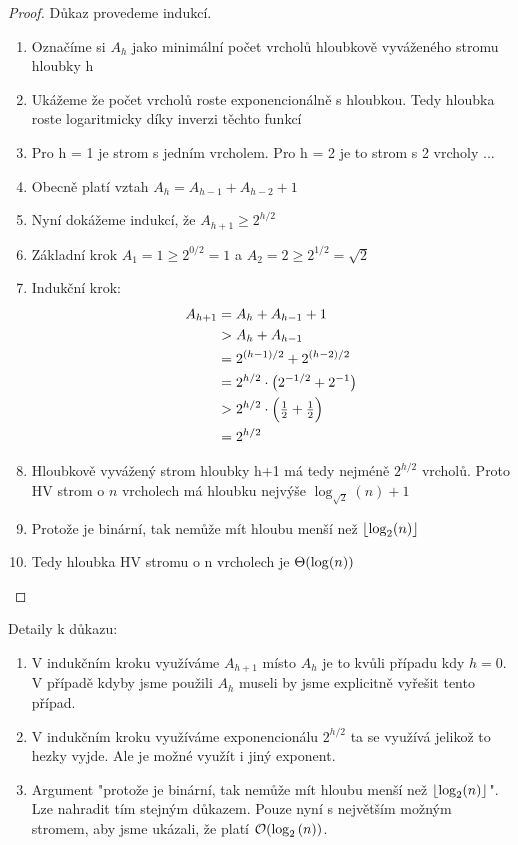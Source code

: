 \begin{proof}
    Důkaz provedeme indukcí.

    \begin{enumerate}
        \item Označíme si $A_h$ jako minimální počet vrcholů hloubkově vyváženého stromu hloubky h
        \item Ukážeme že počet vrcholů roste exponencionálně s hloubkou. Tedy hloubka roste logaritmicky díky inverzi těchto funkcí
        \item Pro h = 1 je strom s jedním vrcholem. Pro h = 2 je to strom s 2 vrcholy ...\\[-4\baselineskip]
        
        \item Obecně platí vztah $A_h = A_{h-1} + A_{h-2} + 1$
        \item Nyní dokážeme indukcí, že $A_{h+1} \geq 2^{h/2}$
        \item Základní krok $A_1 = 1 \geq 2^{0/2} = 1$ a $A_2 = 2 \geq 2^{1/2} = \sqrt{2}$
        \item Indukční krok:
        \begin{align*}
            A_{h+1} &= A_h + A_{h-1} + 1 \\
                    &> A_h + A_{h-1} \\
                    &= 2^{(h-1)/2} + 2^{(h-2)/2} \\
                    &= 2^{h/2}\cdot\bigl(2^{-1/2} + 2^{-1}\bigr) \\
                    &> 2^{h/2}\cdot\Bigl(\tfrac12 + \tfrac12\Bigr) \\
                    &= 2^{h/2}
        \end{align*}
        \item Hloubkově vyvážený strom hloubky h+1 má tedy nejméně ${2^{h/2}}$ vrcholů. Proto HV strom o $n$ vrcholech má hloubku nejvýše $\log_{\sqrt{2}}(n) + 1$

        \item Protože je binární, tak nemůže mít hloubu menší než $\left\lfloor\log_{2}(n)\right\rfloor$
        \item Tedy hloubka HV stromu o n vrcholech je $\Theta(\log(n))$
    \end{enumerate}
\end{proof}

\begin{remark}
    \noindent Detaily k důkazu:
    \begin{enumerate}
        \item V indukčním kroku využíváme $A_{h+1}$ místo $A_h$ je to kvůli případu kdy $h = 0$. V případě kdyby jsme použili $A_h$ museli by jsme explicitně vyřešit tento případ.
        \item V indukčním kroku využíváme exponencionálu $2^{h/2}$ ta se využívá jelikož to hezky vyjde. Ale je možné využít i jiný exponent. 
        \item Argument "protože je binární, tak nemůže mít hloubu menší než $\left\lfloor\log_{2}(n)\right\rfloor$". Lze nahradit tím stejným důkazem. Pouze nyní s největším možným stromem, aby jsme ukázali, že platí $\mathcal{O}(\log_2{(n)})$.
    \end{enumerate}
\end{remark} \bigskip

